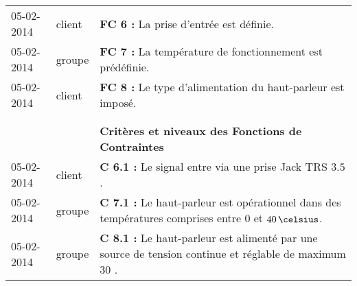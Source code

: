 \begin{table}[H]
\begin{changemargin}{-1cm}{2cm}
\begin{tabular}{|p{2cm}|p{1.5cm}|p{13cm}|}
		05-02-2014 & client & \textbf{FC 6 :} La prise d’entrée est définie.\\

		05-02-2014 & groupe & \textbf{FC 7 :} La température de fonctionnement est prédéfinie.\\
	
		05-02-2014 & client & \textbf{FC 8 :} Le type d’alimentation du haut-parleur est imposé.\\
	 & &\\
\hline
	& &\\
		& & \textbf{ Critères et niveaux des Fonctions de Contraintes}\\

	 	05-02-2014 & client & \textbf{C 6.1 :} Le signal entre via une prise Jack TRS $3.5$ \milli \meter.\\

		05-02-2014 & groupe & \textbf{C 7.1 :} Le haut-parleur est opérationnel dans des températures comprises entre $0$ et $40\,\celsius$.\\
	
		05-02-2014 & groupe & \textbf{C 8.1 :} Le haut-parleur est alimenté par une source de tension continue et réglable de maximum $30$ \volt.\\
	
\hline
 \end{tabular}
 \end{changemargin}
  \end{table}